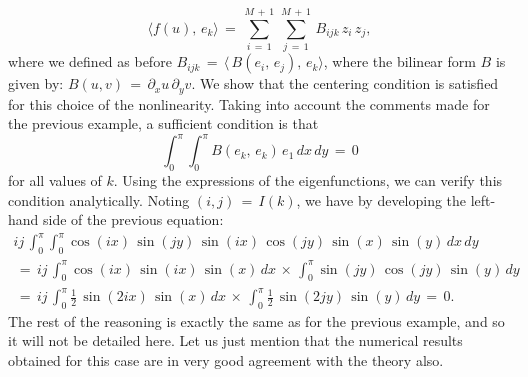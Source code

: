 \begin{equation}
    \langle f(u),\,e_k\rangle \,=\,\sum_{ i\,=\,1}^{ M\,+\,1}\, \sum_{ j\,=\,1}^{ M\,+\,1}\,B_{ijk}\,z_i\,z_j, 
    \label{eq: projection nonlin example}
\end{equation}
where we defined as before $B_{ijk} \,=\, \langle\, B(e_i,\,e_j),\,e_k \rangle$, where the bilinear form $B$ is given by: $B(u,v) \,=\, {\partial}_x u \, {\partial}_y v$. We show that the centering condition is satisfied for this choice of the nonlinearity. Taking into account the comments made for the previous example, a sufficient condition is that
$$
\int_{ 0}^{ {\pi}}\int_{ 0}^{ {\pi}} B(e_k,\,e_k) \, e_1 \, dx\, dy \,=\,0
$$
for all values of $k$. Using the expressions of the eigenfunctions, we can verify this condition analytically. Noting $(i,j) \,=\,I(k)$, we have by developing the left-hand side of the previous equation:
\begin{multline*}
    ij\,\int_{ 0}^{ {\pi}} \int_{ 0}^{ {\pi}} \cos(ix)\,\sin(jy)\,\sin(ix)\,\cos(jy)\,\sin(x)\,\sin(y)\, dx\, dy \\\,=\, ij\,\int_0^{\pi}\cos(ix)\,\sin(ix)\, \sin(x) \, dx \,{\times}\, \int_{ 0}^{ {\pi}} \sin(jy)\, \cos(jy)\, \sin(y)\,dy \\ \,=\, ij\,\int_{ 0}^{ {\pi}} \frac{1}{2}\,\sin(2ix)\,\sin(x) \, dx \,{\times}\,\int_{ 0}^{ {\pi}} \frac{1}{2}\,\sin(2jy)\,\sin(y)\,dy\,=\,0.
\end{multline*}
The rest of the reasoning is exactly the same as for the previous example, and
so it will not be detailed here. Let us just mention that the numerical results
obtained for this case are in very good agreement with the theory also.


